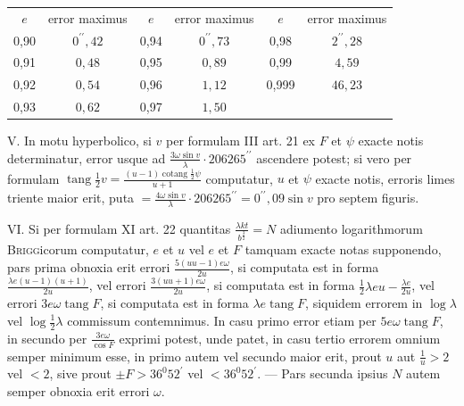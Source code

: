 \begin{center}
\begin{tabular}{c|c||c|c||c|c}
$e$ & error maximus & $e$ & error maximus & $e$ & error maximus \\
0,90 & $0^{\prime\prime}{,}42$ & 0,94 & $0^{\prime\prime}{,}73$ & 0,98 & $2^{\prime\prime}{,}28$ \\
0,91 & $0{,}48$ & 0,95 & $0{,}89$ & 0,99 & $4{,}59$ \\
0,92 & $0{,}54$ & 0,96 & $1{,}12$ & 0,999 & $46{,}23$ \\
0,93 & $0{,}62$ & 0,97 & $1{,}50$ & & \\
\end{tabular}
\end{center}

V. In motu hyperbolico, si $v$ per formulam III art. 21 ex $F$ et $\psi$ exacte notis determinatur, error usque ad $\frac{3\omega\sin v}{\lambda}\cdot206265^{\prime\prime}$ ascendere potest; si vero per formulam $\operatorname{tang}\frac{1}{2}v=\frac{(u-1)\operatorname{cotang}\frac{1}{2}\psi}{u+1}$ computatur, $u$ et $\psi$ exacte notis, erroris limes triente maior erit, puta $=\frac{4\omega\sin v}{\lambda}\cdot206265^{\prime\prime}=0^{\prime\prime}{,}09\sin v$ pro septem figuris.

VI. Si per formulam XI art. 22 quantitas $\frac{\lambda kt}{b^{\frac{3}{2}}}=N$ adiumento logarithmorum \textsc{Brigg}icorum computatur, $e$ et $u$ vel $e$ et $F$ tamquam exacte notas supponendo, pars prima obnoxia erit errori $\frac{5(uu-1)e\omega}{2u}$, si computata est in forma $\frac{\lambda e(u-1)(u+1)}{2u}$, vel errori $\frac{3(uu+1)e\omega}{2u}$, si computata est in forma $\frac{1}{2}\lambda eu-\frac{\lambda e}{2u}$, vel errori $3e\omega\operatorname{tang}F$, si computata est in forma $\lambda e\operatorname{tang}F$, siquidem errorem in $\log\lambda$ vel $\log\frac{1}{2}\lambda$ commissum contemnimus. In casu primo error etiam per
$5e\omega\operatorname{tang}F$, in secundo per $\frac{3e\omega}{\cos F}$ exprimi potest, unde patet, in casu tertio errorem omnium semper minimum esse, in primo autem vel secundo maior erit, prout $u$ aut $\frac{1}{u}>2$ vel $<2$, sive prout $\pm F>36^0 52^{\prime}$ vel $<36^0 52^{\prime}$. — Pars secunda ipsius $N$ autem semper obnoxia erit errori $\omega$.

